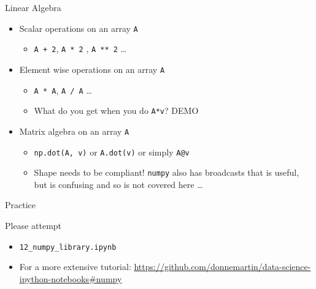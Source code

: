 \documentclass[presentation]{beamer}
\begin{document}
\begin{frame}[label={sec:orgdfdf9b7},fragile]{Linear Algebra}

\begin{itemize}
\item Scalar operations on an array \texttt{A}
\begin{itemize}
\item \texttt{A + 2}, \texttt{A * 2} , \texttt{A ** 2} \ldots{}
\end{itemize}
\item Element wise operations on an array \texttt{A}
\begin{itemize}
\item \texttt{A * A}, \texttt{A / A} \ldots{}
\item What do you get when you do \texttt{A*v}? \alert{DEMO}
\end{itemize}
\item Matrix algebra on an array \texttt{A}
\begin{itemize}
\item \texttt{np.dot(A, v)} or \texttt{A.dot(v)} or simply \texttt{A@v}
\item Shape needs to be compliant! \texttt{numpy} also has broadcasts that is useful,
but is confusing and so is not covered here \ldots{}
\end{itemize}
\end{itemize}
\end{frame}

\begin{frame}[label={sec:org8e0f4f4},fragile]{Practice}
 \begin{block}{Please attempt}
\begin{itemize}
\item \texttt{12\_numpy\_library.ipynb}
\item For a more extensive tutorial: \url{https://github.com/donnemartin/data-science-ipython-notebooks\#numpy}
\end{itemize}
\end{block}
\end{frame}
\end{document}
